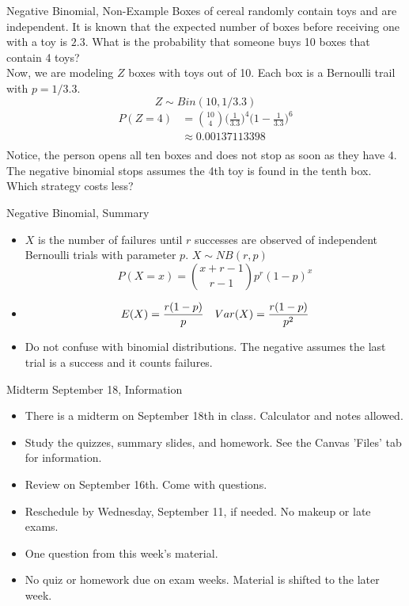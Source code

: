\documentclass[handout]{beamer}
\newcommand{\nl}[1]{\vspace{#1 em}}
\begin{document}
            \begin{frame}{Negative Binomial, Non-Example}
                Boxes of cereal randomly contain toys and are independent. It is known that the expected number of boxes before receiving one with a toy is $2.3$. What is the probability that someone buys 10 boxes that contain 4 toys?
                \\ \nl{0.5}
                \pause Now, we are modeling $Z$ boxes with toys out of 10. Each box is a Bernoulli trail with $p=1/3.3$.
                \pause $$Z\sim Bin(10,1/3.3)$$
                \pause \begin{align*}
                    P(Z = 4) &= \binom{10}{4} \bigg(\frac{1}{3.3}\bigg)^4\bigg(1- \frac{1}{3.3}\bigg)^{6} \\
                    & \approx 0.00137113398 \\
                \end{align*}
                Notice, the person opens all ten boxes and does not stop as soon as they have $4$. The negative binomial stops assumes the 4th toy is found in the tenth box. Which strategy costs less?
        \end{frame}
        \begin{frame}{Negative Binomial, Summary}
            \begin{itemize}
                \item $X$ is the number of failures until $r$ successes are observed of independent Bernoulli trials with parameter $p$. $X\sim NB(r,p)$
                $$P(X=x)= \binom{x+r-1}{r-1}p^r (1-p)^x$$
                \item $$ E(X) = \frac{r(1-p)}{p} \hskip 1em Var(X) = \frac{r(1-p)}{p^2} $$
                \item Do not confuse with binomial distributions. The negative assumes the last trial is a success and it counts failures.
            \end{itemize}
    \end{frame}

    \begin{frame}{Midterm September 18, Information}
        \begin{itemize}
            \item There is a midterm on September 18th in class. Calculator and notes allowed.
            \item Study the quizzes, summary slides, and homework. See the Canvas 'Files' tab for information.
            \item Review on September 16th. Come with questions.
            \item Reschedule by Wednesday, September 11, if needed. No makeup or late exams.
            \item One question from this week's material.
            \item No quiz or homework due on exam weeks. Material is shifted to the later week.
        \end{itemize}
    \end{frame}
\end{document}
